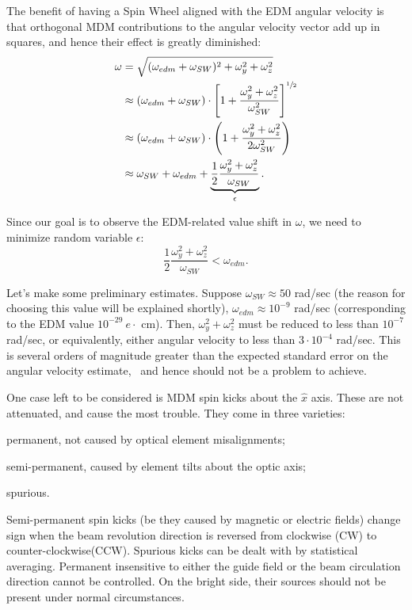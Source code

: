 \documentclass[a4paper]{jacow}
\newcommand{\w}{\omega}
\newcommand{\wedm}{\w_{edm}}
\newcommand{\wsw}{\w_{SW}}
\begin{document}
The benefit of having a Spin Wheel aligned with the EDM angular velocity is that orthogonal MDM contributions
to the angular velocity vector add up in squares, and hence their effect is greatly diminished:
\begin{align*}
  \w &= \sqrt{(\wedm + \wsw)^2 + \w_y^2 + \w_z^2} \\
  &\approx(\wedm + \wsw)\cdot \bkt*{1 + \frac{\w_y^2 + \w_z^2}{\wsw^2}}^{\sfrac12} \\
  &\approx (\wedm + \wsw)\cdot \bkt{1 + \frac{\w_y^2 + \w_z^2}{2\wsw^2}} \\
  &\approx \wsw + \wedm + \underbrace{\frac12\frac{\w_y^2 + \w_z^2}{\wsw}}_{\epsilon}.
\end{align*}

Since our goal is to observe the EDM-related value shift in $\w$, we need to minimize random variable
$\epsilon$:
\[
\frac12\frac{\w_y^2 + \w_z^2}{\wsw} < \wedm.
\]

Let's make some preliminary estimates. Suppose $\wsw\approx 50$ rad/sec (the reason for choosing this
value will be explained shortly), $\wedm\approx10^{-9}$ rad/sec (corresponding to the EDM value
$10^{-29}~e\cdot$ cm). Then, $\w_y^2 + \w_z^2$ must be reduced to less than $10^{-7}$ rad/sec, or equivalently,
either angular velocity to less than $3\cdot 10^{-4}$ rad/sec. This is several orders of magnitude greater than
the expected standard error on the angular velocity estimate,~\cite{Aksentev:Stats} and hence
should not be a problem to achieve.

One case left to be considered is MDM spin kicks about the $\hat x$ axis. These are not attenuated, and cause the
most trouble. They come in three varieties:
\begin{inparaenum}
\item permanent, not caused by optical element misalignments;
\item semi-permanent, caused by element tilts about the optic axis;
\item spurious.
\end{inparaenum}

Semi-permanent spin kicks (be they caused by magnetic or electric fields) change sign when
the beam revolution direction is reversed from clockwise (CW) to counter-clockwise(CCW).
Spurious kicks can be dealt with by statistical averaging.
Permanent insensitive to either the guide field or the beam circulation direction cannot be controlled.
On the bright side, their sources should not be present under normal circumstances.
\end{document}
